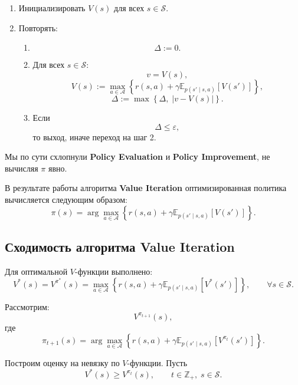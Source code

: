 \documentclass[12pt,a4paper]{article}
\begin{document}
\begin{enumerate}
    \item Инициализировать $V(s)$ для всех $s \in \mathcal S$.

    \item Повторять:
    \begin{enumerate}
        \item
        \[
        \Delta := 0.
        \]

        \item Для всех $s \in \mathcal S$:
        \[
        v = V(s),
        \]
        \[
        V(s)
        :=
        \max_{a \in \mathcal A}
        \left\{
        r(s,a)
        +
        \gamma
        \mathbb E_{p(s'\mid s,a)}
        \left[
        V(s')
        \right]
        \right\},
        \]
        \[
        \Delta := \max\left\{\Delta,\; |v - V(s)|\right\}.
        \]

        \item Если
        \[
        \Delta \le \varepsilon,
        \]
        то выход, иначе переход на шаг 2.
    \end{enumerate}
\end{enumerate}

Мы по сути схлопнули \textbf{Policy Evaluation} и \textbf{Policy Improvement}, не вычисляя $\pi$ явно.

В результате работы алгоритма \textbf{Value Iteration} оптимизированная политика вычисляется следующим образом:
\[
\pi(s)
=
\arg\max_{a \in \mathcal A}
\left\{
r(s,a)
+
\gamma
\mathbb E_{p(s'\mid s,a)}
\left[
V(s')
\right]
\right\}.
\]

\subsection{Сходимость алгоритма Value Iteration}

Для оптимальной $V$-функции выполнено:
\[
V^\ast(s)
=
V^{\pi^\ast}(s)
=
\max_{a \in \mathcal A}
\left\{
r(s,a)
+
\gamma
\mathbb E_{p(s'\mid s,a)}
\left[
V^\ast(s')
\right]
\right\},
\qquad
\forall s \in \mathcal S.
\]

Рассмотрим:
\[
V^{\pi_{t+1}}(s),
\]
где
\[
\pi_{t+1}(s)
=
\arg\max_{a \in \mathcal A}
\left\{
r(s,a)
+
\gamma
\mathbb E_{p(s'\mid s,a)}
\left[
V^{\pi_t}(s')
\right]
\right\}.
\]

Построим оценку на невязку по $V$-функции. Пусть
\[
V^\ast(s) \ge V^{\pi_t}(s),
\qquad
t \in \mathbb Z_+,\; s \in \mathcal S.
\]
\end{document}
